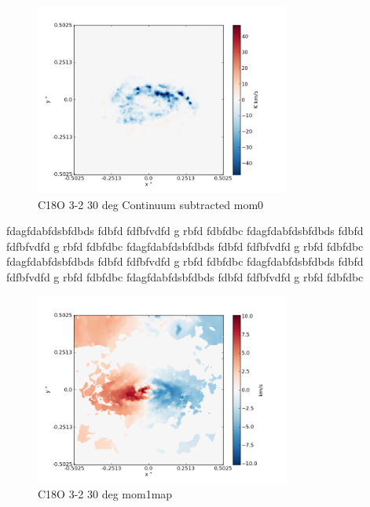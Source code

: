 \documentclass[useAMS,usenatbib]{mn2e}
\begin{document}
\begin{figure}
 \includegraphics[width=84mm]{Figures/sim/imageC18O_3-2_30deg_contSub.png}

 \caption{C18O 3-2  30 deg Continuum subtracted mom0}
\end{figure}

fdagfdabfdsbfdbds fdbfd  fdfbfvdfd g rbfd fdbfdbc \newline fdagfdabfdsbfdbds fdbfd  fdfbfvdfd g rbfd fdbfdbc \newline fdagfdabfdsbfdbds fdbfd  fdfbfvdfd g rbfd fdbfdbc \newline fdagfdabfdsbfdbds fdbfd  fdfbfvdfd g rbfd fdbfdbc \newline fdagfdabfdsbfdbds fdbfd  fdfbfvdfd g rbfd fdbfdbc \newline fdagfdabfdsbfdbds fdbfd  fdfbfvdfd g rbfd fdbfdbc \newline


\begin{figure}
 \includegraphics[width=84mm]{Figures/sim/imageC18O_3-2_30deg_mom1.png}

 \caption{C18O 3-2 30 deg mom1map}
\end{figure}
\end{document}
